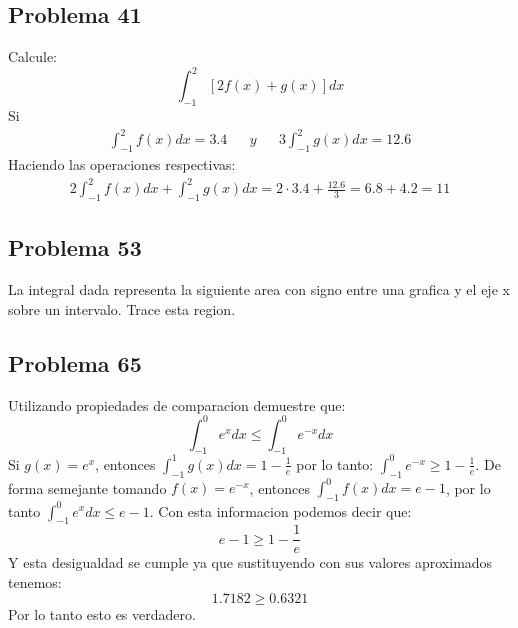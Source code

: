 \documentclass{article}
\begin{document}
\subsection{Problema 41}
Calcule:
$$
  \int_{-1}^{2} [2f(x)+g(x)]dx
$$
Si
\begin{align*}
  \int_{-1}^{2}f(x)dx = 3.4 &  & y &  & 3\int_{-1}^{2}g(x)dx=12.6
\end{align*}
Haciendo las operaciones respectivas:
\begin{align*}
  2\int_{-1}^{2}f(x)dx + \int_{-1}^{2}g(x)dx = 2\cdot3.4 + \frac{12.6}{3} = 6.8 + 4.2 = 11
\end{align*}
\subsection{Problema 53}
La integral dada representa la siguiente area con signo entre una grafica y el eje x sobre un intervalo. Trace esta region. \newline
\begin{center}
\end{center}
\subsection{Problema 65}
Utilizando propiedades de comparacion demuestre que:
$$\int_{-1}^{0}e^xdx\leq \int_{-1}^{0}e^{-x}dx$$
Si \(g(x)=e^x\), entonces \(\int_{-1}^{1}g(x)dx=1-\frac{1}{e}\) por lo tanto: \(\int_{-1}^{0}e^{-x}\geq 1-\frac{1}{e}\).
\newline
De forma semejante tomando \(f(x) = e^{-x}\), entonces \(\int_{-1}^{0}f(x)dx = e-1\), por lo tanto \(\int_{-1}^{0}e^xdx\leq e-1\). \newline
Con esta informacion podemos decir que:
$$
  e-1 \geq 1- \frac{1}{e}
$$
Y esta desigualdad se cumple ya que sustituyendo con sus valores aproximados tenemos:
$$1.7182\geq 0.6321$$
Por lo tanto esto es verdadero.
\end{document}
